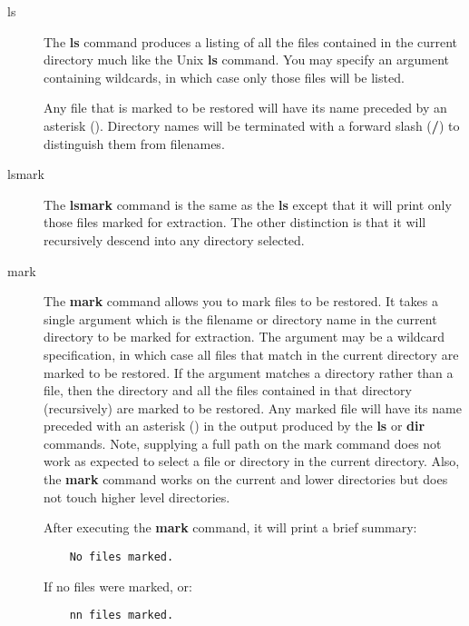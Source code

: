 \begin{description}
\item [ls]
   The {\bf ls} command produces a listing of all the files  contained in the
   current directory much like the Unix {\bf ls} command.  You may specify an
   argument containing wildcards, in which case only  those files will be
   listed.

   Any file that is marked to be restored will  have its name preceded by an
   asterisk ({\bf *}). Directory names  will be terminated with a forward slash
   ({\bf /}) to distinguish them  from filenames.

\item [lsmark]
   The {\bf lsmark} command is the same as the  {\bf ls} except that it will
   print only those files marked for  extraction. The other distinction is that
   it will recursively  descend into any directory selected.

\item [mark]
   The {\bf mark} command allows you to mark files to be restored. It takes a
   single argument which is the filename  or directory name in the current
   directory to be marked for extraction.  The argument may be a wildcard
   specification, in which  case all files that match in the current directory
   are marked to be  restored. If the argument matches a directory rather than a
   file,  then the directory and all the files contained in that directory
   (recursively)  are marked to be restored. Any marked file will have its name
   preceded with an asterisk ({\bf *}) in the output produced by the  {\bf ls}
or
   {\bf dir} commands. Note, supplying a full path on  the mark command does not
   work as expected to select a file or  directory in the current directory.
   Also, the {\bf mark} command works  on the current and lower directories but
   does not touch higher level  directories.

   After executing the {\bf mark} command, it will print a brief summary:

\footnotesize
\begin{verbatim}
    No files marked.

\end{verbatim}
\normalsize

   If no files were marked, or:

\footnotesize
\begin{verbatim}
    nn files marked.


\end{verbatim}
\end{description}
